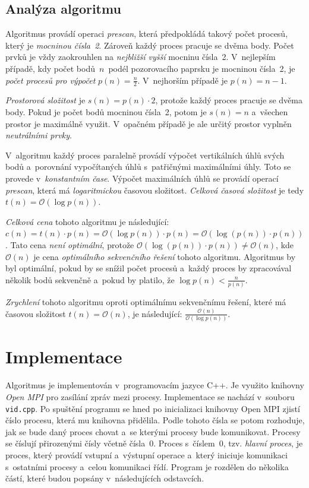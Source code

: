 \documentclass[a4paper, 10pt, twocolumn]{article}
\begin{document}
    \subsection{Analýza algoritmu}

    Algoritmus provádí operaci \emph{prescan}, která předpokládá takový
    počet procesů, který je \emph{mocninou čísla~2}. Zároveň každý proces
    pracuje se dvěma body. Počet prvků je vždy zaokrouhlen na
    \emph{nejbližší vyšší} mocninu čísla~2. V~nejlepším případě, kdy počet
    bodů~$ n $~podél pozorovacího paprsku je mocninou čísla~2, je
    \emph{počet procesů pro výpočet} $ p(n) = \frac{n}{2} $. V~nejhorším
    případě je $ p(n) = n - 1 $.

    \emph{Prostorová složitost} je $ s(n) = p(n) \cdot 2 $, protože každý
    proces pracuje se dvěma body. Pokud je počet bodů mocninou čísla~2,
    potom je $ s(n) = n $ a~všechen prostor je maximálně využit. V~opačném
    případě je ale určitý prostor vyplněn \emph{neutrálními prvky}.

    V~algoritmu každý proces paralelně provádí výpočet vertikálních úhlů
    svých bodů a~porovnání vypočítaných úhlů s~patřičnými maximálními úhly.
    Toto se provede v~\emph{konstantním čase}. Výpočet maximálních úhlů
    se provádí operací \emph{prescan}, která má \emph{logaritmickou} časovou
    složitost. \emph{Celková časová složitost} je tedy $ t(n) =
    \mathcal{O}(\log p(n)) $.

    \emph{Celková cena} tohoto algoritmu je následující: $ c(n) = t(n)
    \cdot p(n) = \mathcal{O}(\log p(n)) \cdot p(n) = \mathcal{O}(\log(p(n))
    \cdot p(n)) $. Tato cena \emph{není optimální}, protože $ \mathcal{O}(
    \log(p(n)) \cdot p(n)) \neq \mathcal{O}(n) $, kde $ \mathcal{O}(n) $ je
    cena \emph{optimálního sekvenčního řešení} tohoto algoritmu. Algoritmus
    by byl optimální, pokud by se snížil počet procesů a~každý proces by
    zpracovával několik bodů sekvenčně a~pokud by platilo, že $ \log p(n)
    < \frac{n}{p(n)} $.

    \emph{Zrychlení} tohoto algoritmu oproti optimálnímu sekvenčnímu řešení,
    které má časovou složitost $ t(n) = \mathcal{O}(n) $, je následující:
    $ \frac{\mathcal{O}(n)}{\mathcal{O}(\log p(n))} $.


    \section{Implementace}

    Algoritmus je implementován v~programovacím jazyce C++. Je využito
    knihovny \emph{Open MPI} pro zasílání zpráv mezi procesy. Implementace
    se nachází v~souboru \texttt{vid.cpp}. Po spuštění programu se hned
    po inicializaci knihovny Open MPI zjistí číslo procesu, která mu
    knihovna přidělila. Podle tohoto čísla se potom rozhoduje, jak se
    bude daný proces chovat a~se kterými procesy bude komunikovat. Procesy
    se číslují přirozenými čísly včetně čísla~0. Proces s~číslem~0, tzv.
    \emph{hlavní proces}, je proces, který provádí vstupní a~výstupní
    operace a~který iniciuje komunikaci s~ostatními procesy a~celou
    komunikaci řídí. Program je rozdělen do několika částí, které budou
    popsány v~následujících odstavcích.
\end{document}
